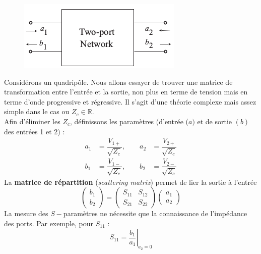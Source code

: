 	\begin{figure}
	\vspace{-5mm}
	\includegraphics[scale=0.45]{ch2/image8.png}
	\end{figure}
Considérons un quadripôle. Nous allons essayer de trouver une matrice de transformation entre 
l'entrée et la sortie, non plus en terme de tension mais en terme d'onde progressive et 
régressive. Il s'agit d'une théorie complexe mais assez simple dans le cas ou $Z_c\in\mathbb{R}$.\\
Afin d'éliminer les $Z_c$, définissons les paramètres (d'entrée ($a)$ et de sortie $(b)$ des 
entrées 1 et 2) :
\begin{equation}
\begin{array}{lll}
a_1 &= \dfrac{V_{1+}}{\sqrt{Z_c}},\qquad a_2 &= \dfrac{V_{2+}}{\sqrt{Z_c}}\\
b_1 &= \dfrac{V_{1-}}{\sqrt{Z_c}},\qquad b_2 &= \dfrac{V_{2-}}{\sqrt{Z_c}}
\end{array}
\end{equation}
La \textbf{matrice de répartition} (\textit{scattering matrix}) permet de lier la sortie 
à l'entrée
\begin{equation}
\left(\begin{array}{c}
b_1\\
b_2
\end{array}\right) = \left(\begin{array}{cc}
S_{11} & S_{12}\\
S_{21} & S_{22}
\end{array}\right)\left(\begin{array}{c}
a_1\\
a_2
\end{array}\right)
\end{equation}
La mesure des $S-$paramètres ne nécessite que la connaissance de l'impédance des ports. Par 
exemple, pour $S_{11}$ :
\begin{equation}
S_{11} = \left.\dfrac{b_1}{a_1}\right|_{a_2=0}
\end{equation}
	
	
